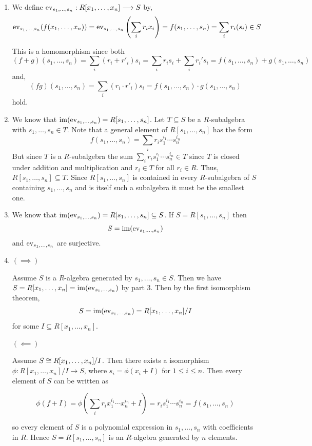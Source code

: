 \documentclass[Notebook.tex]{subfiles}
\begin{document}
\begin{solution}
    \bbni
    \begin{enumerate}
        \item We define $\operatorname{ev}_{s_1,\ldots,s_n}:R[x_1,\ldots,x_n]\longrightarrow S$ by, 
        \[\operatorname{ev}_{s_1,\ldots,s_n}(f(x_1, \ldots, x_n)) = \operatorname{ev}_{s_1,\ldots,s_n}\left(\sum_i r_i x_i\right) = f(s_1, \ldots, s_n) = \sum_i r_i(s_i) \in S\]

        This is a homomorphism since both 
        \[(f+g)(s_1, \ldots, s_n) = \sum_i (r_i + r'_i) s_i = \sum_i r_i s_i + \sum_i r_i' s_i = f(s_1, \ldots, s_n) + g(s_1, \ldots, s_n)\] 
        and,
        \[(fg)(s_1, \ldots, s_n) = \sum_i (r_i \cdot r'_i) s_i = f(s_1, \ldots, s_n) \cdot g(s_1, \ldots, s_n)\] 
        hold.

        \item We know that $\operatorname{im}(\operatorname{ev}_{s_1,\ldots,s_n}) = R[s_1, \ldots, s_n]$. Let $T \subseteq S$ be a $R$-subalgebra with $s_1, \ldots, s_n \in T$. Note that a general element of $R[s_1, \ldots, s_n]$ has the form 
        \[f(s_1, \ldots, s_n) = \sum_i r_i s_1^{i_1} \cdots s_n^{i_n}\]
        But since $T$ is a $R$-subalgebra the sum $ \sum_i r_i s_1^{i_1} \cdots s_n^{i_n} \in T$ since $T$ is closed under addition and multiplication and $r_i \in T$ for all $r_i \in R$. Thus, $R[s_1, \ldots, s_n] \subseteq T$. Since $R[s_1, \ldots, s_n]$ is contained in every $R$-subalgebra of $S$ containing $s_1, \ldots, s_n$ and is itself such a subalgebra it must be the smallest one. 

        \item We know that $\operatorname{im}(\operatorname{ev}_{s_1,\ldots,s_n}) = R[s_1, \ldots, s_n] \subseteq S$. If 
        $S = R[s_1, \ldots, s_n]$ then 
        \[S  = \operatorname{im}(\operatorname{ev}_{s_1,\ldots,s_n})\]
        and $\operatorname{ev}_{s_1,\ldots,s_n}$ are surjective. 

        \item $(\implies)$ 
        
        Assume $S$ is a $R$-algebra generated by $s_1, \ldots, s_n \in S$. Then we have $S = R[x_1, \ldots, x_n] = \operatorname{im}(\operatorname{ev}_{s_1,\ldots,s_n})$ by part 3. Then by the first isomorphism theorem, 
        \[S = \operatorname{im}(\operatorname{ev}_{s_1,\ldots,s_n}) = R[x_1, \ldots, x_n]/I\]
        for some $I \subseteq R[x_1, \ldots, x_n]$. 

        $(\impliedby)$

        Assume $S \cong R[x_1, \ldots, x_n] / I$. Then there exists a isomorphism $\phi: R[x_1, \ldots, x_n] / I \to S$, where $s_i = \phi(x_i + I)$ for $1 \leq i \leq n$. Then every element of $S$ can be written as 

        \[\phi(f + I) = \phi\left(\sum_i r_ix_1^{i_1} \cdots x_n^{i_n} + I\right) = r_is_1^{i_1} \cdots s_n^{i_n} = f(s_1, \ldots, s_n)\]

        so every element of $S$ is a polynomial expression in $s_1, \ldots, s_n$ with coefficients in $R$. Hence $S = R[s_1, \ldots, s_n]$ is an $R$-algebra generated by $n$ elements. 
    \end{enumerate}
\end{solution}
\end{document}
